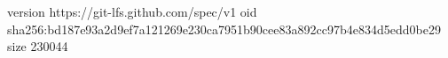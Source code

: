version https://git-lfs.github.com/spec/v1
oid sha256:bd187e93a2d9ef7a121269e230ca7951b90cee83a892cc97b4e834d5edd0be29
size 230044
